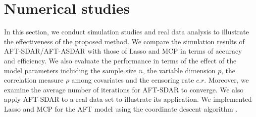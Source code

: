 \documentclass[12pt]{article}
\begin{document}
\section{Numerical studies}
\label{sec:6}
In this section, we conduct simulation studies  and real data analysis
to illustrate the effectiveness of the proposed method. We compare the  simulation results of AFT-SDAR/AFT-ASDAR with those of Lasso and MCP in  terms of accuracy and efficiency.
We also evaluate the performance
in terms of the effect of the  model parameters including the sample size $n$,  the variable dimension $p$, the correlation measure $\rho$ among covariates and the censoring rate  $c.r$.
Moreover,  we examine the average number of iterations for AFT-SDAR
to converge.
We also apply AFT-SDAR to a real data set to illustrate its application.
We implemented Lasso and MCP for the AFT model
using the coordinate descent algorithm %
\citep{breheny2011coordinate}.


\end{document}
